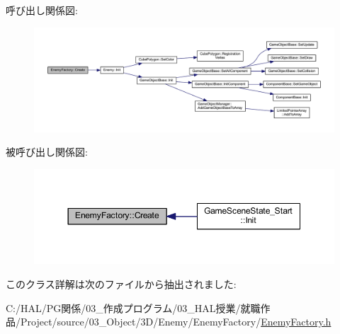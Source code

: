 呼び出し関係図\+:\nopagebreak
\begin{figure}[H]
\begin{center}
\leavevmode
\includegraphics[width=350pt]{class_enemy_factory_a74729ede6a5f0e1cbdf3215a052e314a_cgraph}
\end{center}
\end{figure}
被呼び出し関係図\+:\nopagebreak
\begin{figure}[H]
\begin{center}
\leavevmode
\includegraphics[width=350pt]{class_enemy_factory_a74729ede6a5f0e1cbdf3215a052e314a_icgraph}
\end{center}
\end{figure}


このクラス詳解は次のファイルから抽出されました\+:\begin{DoxyCompactItemize}
\item 
C\+:/\+H\+A\+L/\+P\+G関係/03\+\_\+作成プログラム/03\+\_\+\+H\+A\+L授業/就職作品/\+Project/source/03\+\_\+\+Object/3\+D/\+Enemy/\+Enemy\+Factory/\mbox{\hyperlink{_enemy_factory_8h}{Enemy\+Factory.\+h}}\end{DoxyCompactItemize}
